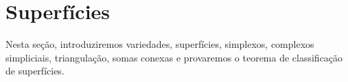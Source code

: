 \section{Superfícies}
\label{superficies}


Nesta seção, introduziremos variedades, superfícies, simplexos, complexos simpliciais, triangulação, somas conexas e provaremos o teorema de classificação de superfícies.












